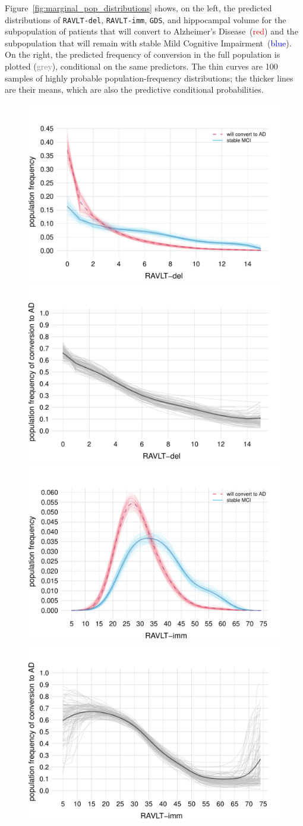 \documentclass[utf8]{FrontiersinHarvard} %
\renewcommand*{\|}[1][]{\nonscript\:#1\vert\nonscript\:\mathopen{}}
\newcommand*{\gds}{\texttt{GDS}}
\newcommand*{\ravltimm}{\texttt{RAVLT-imm}}
\newcommand*{\ravltdel}{\texttt{RAVLT-del}}
\newcommand*{\ad}{Alzheimer's Disease}
\newcommand*{\mci}{Mild Cognitive Impairment}
\begin{document}
Figure~\ref{fig:marginal_pop_distributions} shows, on the left, the predicted distributions of \ravltdel, \ravltimm, \gds, and hippocampal volume for the subpopulation of patients that will convert to \ad\ (\textcolor{red}{red}) and the subpopulation that will remain with stable \mci\ (\textcolor{blue}{blue}). On the right, the predicted frequency of conversion in the full population is plotted (\textcolor{grey}{grey}), conditional on the same predictors. The thin curves are 100 samples of highly probable population-frequency distributions; the thicker lines are their means, which are also the predictive conditional probabilities.
\begin{figure}[!t]
\centering%
\includegraphics[width=0.43\linewidth]{population_distr_RAVLT-del.pdf}%
\qquad%
\includegraphics[width=0.43\linewidth]{prob_conversion_RAVLT-del.pdf}%
\\
\includegraphics[width=0.43\linewidth]{population_distr_RAVLT-imm.pdf}%
\qquad%
\includegraphics[width=0.43\linewidth]{prob_conversion_RAVLT-imm.pdf}%

\end{figure}
\end{document}
